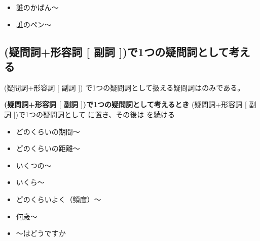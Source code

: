 \begin{enumerate}
\begin{minipage}[t]{0.48\linewidth}
            \begin{itemize}
                \item 誰のかばん〜
            \end{itemize}
        \end{minipage}\hfill
        \begin{minipage}[t]{0.48\linewidth}
            \begin{itemize}
                \item 誰のペン〜
            \end{itemize}
        \end{minipage}
        \par\vspace{0.5em}
    \end{enumerate}
\vspace{1em}

\subsection{(疑問詞+形容詞 [ 副詞 ])で1つの疑問詞として考える}
    (疑問詞+形容詞 [ 副詞 ]) で1つの疑問詞として扱える疑問詞はのみである。

    \begin{theorembox}{\textbf{(疑問詞+形容詞 [ 副詞 ])で1つの疑問詞として考えるとき}}
        (疑問詞+形容詞 [ 副詞 ])で1つの疑問詞として  に置き、その後は  を続ける
    \end{theorembox}
    \vspace{1em}

        \begin{minipage}[t]{0.48\linewidth}
            \begin{itemize}
                \item どのくらいの期間〜
                \item どのくらいの距離〜
                \item いくつの〜
                \item いくら〜
            \end{itemize}
        \end{minipage}\hfill
        \begin{minipage}[t]{0.48\linewidth}
            \begin{itemize}
                \item どのくらいよく（頻度）〜
                \item 何歳〜
                \item 〜はどうですか
            \end{itemize}
        \end{minipage}
\newpage

